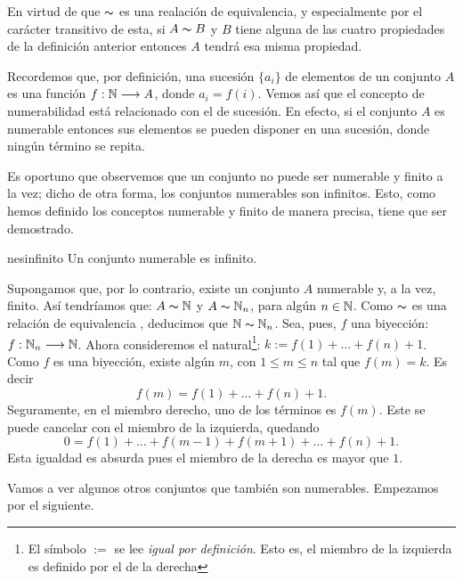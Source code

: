 En virtud de que $\thicksim$ es una realación de equivalencia, y
especialmente por el carácter transitivo de esta, si $A\thicksim
B$ y $B$ tiene alguna de las cuatro propiedades de la definición
anterior entonces $A$ tendrá esa misma propiedad.

Recordemos que, por definición, una sucesión $\{a_i\}$ de
elementos de un conjunto $A$ es una función
$f:\mathbb{N}\longrightarrow A$, donde $a_i=f(i)$. Vemos así que el
concepto de numerabilidad está relacionado con el de sucesión.
En efecto, si el conjunto $A$ es numerable entonces sus elementos
se pueden disponer en una sucesión, donde ningún término se
repita.

Es oportuno que observemos que un conjunto no puede ser numerable
y finito a la vez; dicho de otra forma, los conjuntos numerables
son infinitos. Esto, como hemos definido los conceptos numerable y
finito de  manera precisa, tiene que ser demostrado.

\begin{teorema}{nesinfinito} Un conjunto numerable es
infinito.
\end{teorema}
\begin{demo} Supongamos que, por lo contrario, existe un conjunto
$A$ numerable y, a la vez, finito. Así tendríamos que:
$A\thicksim\mathbb{N}$ y $A\thicksim\mathbb{N}_n$, para algún $n\in\mathbb{N}$. Como
$\thicksim$ es una relación de equivalencia , deducimos que
$\mathbb{N}\thicksim\mathbb{N}_n$. Sea, pues, $f$ una biyección:
$f:\mathbb{N}_n\longrightarrow\mathbb{N}$. Ahora consideremos el
natural\footnote{El símbolo $:=$ se lee \emph{igual por
definición}. Esto es, el miembro de la izquierda es definido por
el de la derecha}: $k:=f(1)+\dots+f(n)+1$. Como $f$ es una
biyección, existe algún $m$, con $1\leq m\leq n$ tal que
$f(m)=k$. Es decir
\[f(m)=f(1)+\dots+f(n)+1.\]
Seguramente, en el miembro derecho, uno de los términos es
$f(m)$. Este se puede cancelar con el miembro de la izquierda,
quedando
\[0=f(1)+\dots+f(m-1)+f(m+1)+\dots+f(n)+1.\]
Esta igualdad es absurda pues el miembro de la derecha es mayor
que $1$.
\end{demo}

Vamos a ver algunos otros conjuntos que también son numerables.
Empezamos por el siguiente.

